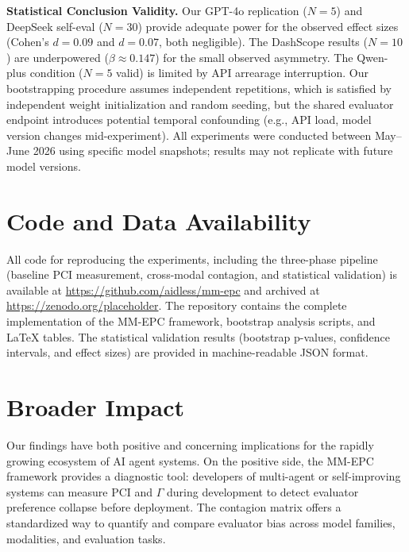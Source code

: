 \documentclass[11pt,a4paper]{article}
\begin{document}
\textbf{Statistical Conclusion Validity.} Our GPT-4o replication ($N=5$) and DeepSeek self-eval ($N=30$) provide adequate power for the observed effect sizes (Cohen's $d=0.09$ and $d=0.07$, both negligible). The DashScope results ($N=10$) are underpowered ($\beta \approx 0.147$) for the small observed asymmetry. The Qwen-plus condition ($N=5$ valid) is limited by API arrearage interruption. Our bootstrapping procedure assumes independent repetitions, which is satisfied by independent weight initialization and random seeding, but the shared evaluator endpoint introduces potential temporal confounding (e.g., API load, model version changes mid-experiment). All experiments were conducted between May--June 2026 using specific model snapshots; results may not replicate with future model versions.

\section{Code and Data Availability}
All code for reproducing the experiments, including the three-phase pipeline (baseline PCI measurement, cross-modal contagion, and statistical validation) is available at \url{https://github.com/aidless/mm-epc} and archived at \url{https://zenodo.org/placeholder}. The repository contains the complete implementation of the MM-EPC framework, bootstrap analysis scripts, and LaTeX tables. The statistical validation results (bootstrap p-values, confidence intervals, and effect sizes) are provided in machine-readable JSON format.

\section{Broader Impact}

Our findings have both positive and concerning implications for the rapidly growing ecosystem of AI agent systems. On the positive side, the MM-EPC framework provides a diagnostic tool: developers of multi-agent or self-improving systems can measure PCI and $\Gamma$ during development to detect evaluator preference collapse before deployment. The contagion matrix offers a standardized way to quantify and compare evaluator bias across model families, modalities, and evaluation tasks.
\end{document}
